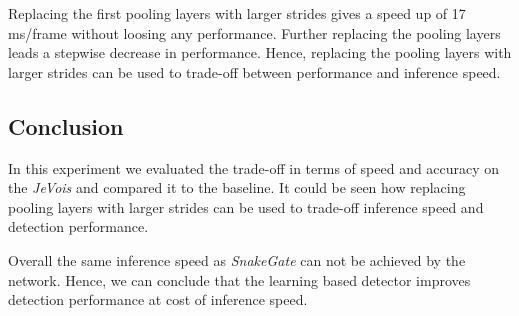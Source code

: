 Replacing the first pooling layers with larger strides gives a speed up of 17 ms/frame without loosing any performance. Further replacing the pooling layers leads a stepwise decrease in performance. Hence, replacing the pooling layers with larger strides can be used to trade-off between performance and inference speed.

\subsection{Conclusion}

In this experiment we evaluated the trade-off in terms of speed and accuracy on the \textit{JeVois} and compared it to the baseline. It could be seen how replacing pooling layers with larger strides can be used to trade-off inference speed and detection performance. 

Overall the same inference speed as \textit{SnakeGate} can not be achieved by the network. Hence, we can conclude that the learning based detector improves detection performance at cost of inference speed.





